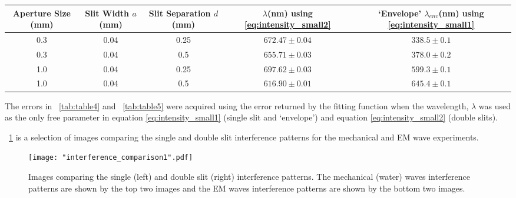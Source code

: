 \documentclass{article}
\newcommand{\figref}[2][\figurename~]{#1\ref{#2}}
\newcommand{\tabref}[2][\tablename~]{#1\ref{#2}}
\begin{document}
\vspace{5mm}
\begin{table*}[h]
\centering %
\caption{Table of experimental values for the wavelength, $\lambda$ of the laser light source by using a non-linear least squares fitting routine to the data with equation \eqref{eq:intensity_small2}  and using equation \eqref{eq:intensity_small1} to fit a single slit `envelope' to the data for the double slit intensity patterns.}
\label{tab:table5}
\begin{tabular}{|c|c|c|c|c|}
\hline
Aperture Size (mm) & Slit Width $a$(mm) & Slit Separation $d$(mm) & $\lambda$(nm) using \eqref{eq:intensity_small2} & `Envelope' $\lambda_{env}$(nm) using \eqref{eq:intensity_small1} \\
\hline
0.3 & 0.04 & 0.25 & $672.47 \pm 0.04$ & $338.5 \pm 0.1$ \\
\hline
0.3 & 0.04 & 0.5 & $655.71 \pm 0.03$ & $378.0 \pm 0.2$ \\
\hline
1.0 & 0.04 & 0.25 & $697.62 \pm 0.03$ & $599.3 \pm 0.1$ \\
\hline
1.0 & 0.04 & 0.5 & $616.90 \pm 0.01$ & $645.4 \pm 0.1$ \\
\hline
\end{tabular}
\end{table*}

\vspace{2mm}
\noindent
The errors in \tabref{tab:table4} and \tabref{tab:table5} were acquired using the error returned by the fitting function when the wavelength, $\lambda$ was used as the only free parameter in equation \eqref{eq:intensity_small1} (single slit and `envelope') and equation \eqref{eq:intensity_small2} (double slits).

\newpage
\vspace{2mm}
\noindent
\figref{fig:interference_comparison} is a selection of images comparing the single and double slit interference patterns for the mechanical and EM wave experiments. 


\begin{figure}[h]
\centering
\texttt{[image: "interference\_comparison1".pdf]}
\caption{Images comparing the single (left) and double slit (right) interference patterns. The mechanical (water) waves interference patterns are shown by the top two images and the EM waves interference patterns are shown by the bottom two images.}
\label{fig:interference_comparison}
\end{figure}
\end{document}
